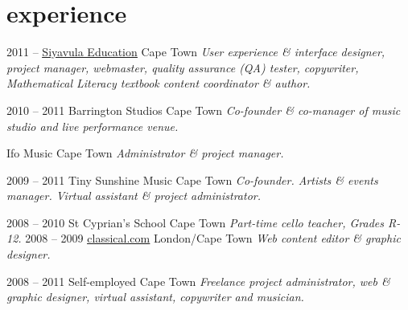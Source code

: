 \documentclass[]{friggeri-cv} %
\begin{document}

\section{experience}

\begin{entrylist}
\entry
{2011 --}
{\href{http://www.siyavula.com}{\underline{Siyavula Education}}}
{Cape Town}
{\emph{User experience \& interface designer, project manager, webmaster, quality assurance (QA) tester, copywriter, Mathematical Literacy textbook content coordinator \& author.}}

\entry
{2010 -- 2011}
{Barrington Studios}
{Cape Town}
{\emph{Co-founder \& co-manager of music studio and live performance venue.}}



\entry
{}
{Ifo Music}
{Cape Town}
{\emph{Administrator \& project manager.}}

\entry
{2009 -- 2011}
{Tiny Sunshine Music}
{Cape Town}
{\emph{Co-founder. Artists \& events manager. Virtual assistant \& project administrator.}}


\entry
{2008 -- 2010}
{St Cyprian's School}
{Cape Town}
{\emph{Part-time cello teacher, Grades R-12.}}
\entry
{2008 -- 2009}
{\href{http://www.classical.com}{\underline{classical.com}}}
{London/Cape Town}
{\emph{Web content editor \& graphic designer.}}


\entry
{2008 -- 2011}
{Self-employed}
{Cape Town}
{\emph{Freelance project administrator, web \& graphic designer, virtual assistant, copywriter and musician.}}

\end{entrylist}

\end{document}
